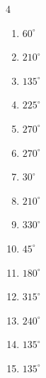 \begin{multicols}{4}
\begin{enumerate}
  \item $\displaystyle 60^{\circ}$

  \item $\displaystyle 210^{\circ}$

  \item $\displaystyle 135^{\circ}$

  \item $\displaystyle 225^{\circ}$

  \item $\displaystyle 270^{\circ}$

  \item $\displaystyle 270^{\circ}$

\columnbreak %

\resetques

  \item $\displaystyle 30^{\circ}$

  \item $\displaystyle 210^{\circ}$

  \item $\displaystyle 330^{\circ}$

  \item $\displaystyle 45^{\circ}$

  \item $\displaystyle 180^{\circ}$
        \phantom{$\displaystyle =\pi$}

  \item $\displaystyle 315^{\circ}$

  \item $\displaystyle 240^{\circ}$

  \item $\displaystyle 135^{\circ}$

  \item $\displaystyle 135^{\circ}$


\end{enumerate}
\end{multicols}
